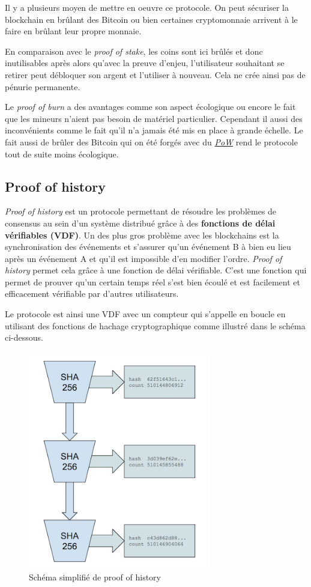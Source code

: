 Il y a plusieurs moyen de mettre en oeuvre ce protocole. On peut sécuriser la blockchain en brûlant des Bitcoin ou bien certaines cryptomonnaie arrivent à le faire en brûlant leur propre monnaie.

En comparaison avec le \textit{proof of stake}, les coins sont ici brûlés et donc inutilisables après alors qu'avec la preuve d'enjeu, l'utilisateur souhaitant se retirer peut débloquer son argent et l'utiliser à nouveau. Cela ne crée ainsi pas de pénurie permanente.

Le \textit{proof of burn} a des avantages comme son aspect écologique ou encore le fait que les mineurs n'aient pas besoin de matériel particulier. Cependant il aussi des inconvénients comme le fait qu'il n'a jamais été mis en place à grande échelle. Le fait aussi de brûler des Bitcoin qui on été forgés avec du \hyperref[consensus:pow]{\textit{PoW}} rend le protocole tout de suite moins écologique.

\subsection{Proof of history}

\textit{Proof of history} \cite{proof:poh} est un protocole permettant de résoudre les problèmes de consensus au sein d'un système distribué grâce à des \textbf{fonctions de délai vérifiables (VDF)}. Un des plus gros problème avec les blockchains est la synchronisation des événements et s'assurer qu'un événement B à bien eu lieu après un événement A et qu'il est impossible d'en modifier l'ordre. \textit{Proof of history} permet cela grâce à une fonction de délai vérifiable. C'est une fonction qui permet de prouver qu'un certain temps réel s'est bien écoulé et est facilement et efficacement vérifiable par d'autres utilisateurs.

Le protocole est ainsi une VDF avec un compteur qui s'appelle en boucle en utilisant des fonctions de hachage cryptographique comme illustré dans le schéma ci-dessous.

\begin{figure}[h!]
    \centering
    \includegraphics[width=8cm]{images/solana}
    \caption{Schéma simplifié de proof of history}
\end{figure}


